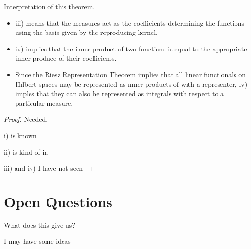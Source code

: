 \documentclass[reqno]{amsart}
\begin{document}
Interpretation of this theorem.
\begin{itemize}
    \item iii) means that the measures act as the coefficients determining the functions using the basis given by the reproducing kernel.
    \item iv) implies that the inner product of two functions is equal to the appropriate inner produce of their coefficients.  
    \item Since the Riesz Representation Theorem implies that all linear functionals on Hilbert spaces may be represented as inner products of with a representer, iv) imples that they can also be represented as integrals with respect to a particular measure.
\end{itemize}

\begin{proof}
Needed.


i) is known

ii) is kind of in \cite{Hic99a}

iii) and iv) I have not seen
\end{proof}


\section{Open Questions}
What does this give us?

I may have some ideas






\end{document}
